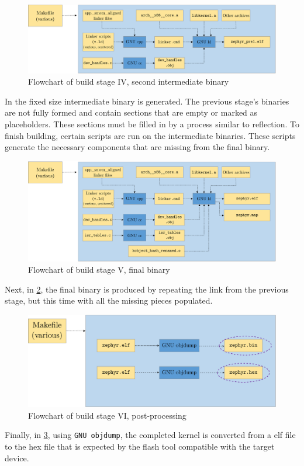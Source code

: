 \begin{figure}[htbp]
	\centering
	\includegraphics[width=.8\textwidth]{Figures/3_cmake_build4.pdf}
	\caption[Flowchart of build stage IV, second intermediate binary]{Flowchart of build stage IV, second intermediate binary}
	\label{fig:3_build4}
\end{figure}
In  the fixed size intermediate binary is generated. The previous stage's binaries are not fully formed and contain sections that are empty or marked as placeholders. These sections must be filled in by a process similar to reflection. To finish building, certain scripts are run on the intermediate binaries. These scripts generate the necessary components that are missing from the final binary.
\begin{figure}[htbp]
	\centering
	\includegraphics[width=.8\textwidth]{Figures/3_cmake_build5.pdf}
	\caption[Flowchart of build stage V, final binary]{Flowchart of build stage V, final binary}
	\label{fig:3_build5}
\end{figure}
Next, in \cref{fig:3_build5}, the final binary is produced by repeating the link from the previous stage, but this time with all the missing pieces populated.
\begin{figure}[htbp]
	\centering
	\includegraphics[width=.6\textwidth]{Figures/3_cmake_build6.pdf}
	\caption[Flowchart of build stage VI, post-processing]{Flowchart of build stage VI, post-processing}
	\label{fig:3_build6}
\end{figure}
Finally, in \cref{fig:3_build6}, using \texttt{GNU objdump}, the completed kernel is converted from a \gls{elf} file to the hex file that is expected by the flash tool compatible with the target device.


